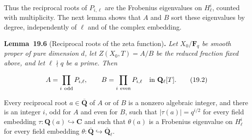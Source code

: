 \documentclass[11pt]{article}
\newenvironment{bpstatement}[2]{\par\addvspace{0.6\baselineskip}\noindent\textbf{#1}#2\textbf{.}\enspace\ignorespaces}
  {\par\addvspace{0.4\baselineskip}}
\newenvironment{bpstatementit}[2]{\begin{bpstatement}{#1}{#2}\itshape\ignorespaces}{\end{bpstatement}}
\begin{document}
\label{bp21}%
Thus the reciprocal roots of \(P_{i,\ell}\) are the Frobenius eigenvalues on \(H^i_\ell\), counted with multiplicity. The next lemma shows that \(A\) and \(B\) sort these eigenvalues by degree, independently of \(\ell\) and of the complex embedding.

\label{bp22}%
\begin{bpstatementit}{Lemma~19.6}{ (Reciprocal roots of the zeta function)}
Let \(X_0/\mathbf F_q\) be smooth proper of pure dimension \(d\), let \(Z(X_0,T)=A/B\) be the reduced fraction fixed above, and let \(\ell\nmid q\) be a prime. Then

\[
A=\prod_{i\ \mathrm{odd}}P_{i,\ell},\qquad
B=\prod_{i\ \mathrm{even}}P_{i,\ell}
\quad\hbox{in }\mathbf Q_\ell[T].
\tag{19.2}
\]

Every reciprocal root \(a\in\overline{\mathbf Q}\) of \(A\) or of \(B\) is a nonzero algebraic integer, and there is an integer \(i\), odd for \(A\) and even for \(B\), such that \(|\tau(a)|=q^{i/2}\) for every field embedding \(\tau:\mathbf Q(a)\hookrightarrow\mathbf C\) and such that \(\theta(a)\) is a Frobenius eigenvalue on \(H^i_\ell\) for every field embedding \(\theta:\overline{\mathbf Q}\hookrightarrow\overline{\mathbf Q}_\ell\).
\end{bpstatementit}
\end{document}

